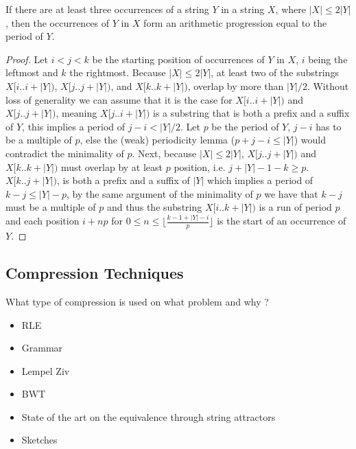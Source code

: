\begin{corollary*}
    If there are at least three occurrences of a string $Y$ in a string $X$, where $|X| \leq 2|Y|$, then the occurrences of $Y$ in $X$ form an arithmetic progression equal to the period of $Y$. 
\end{corollary*}
\begin{proof}
    Let $i<j<k$ be the starting position of occurrences of $Y$ in $X$, $i$ being the leftmost and $k$ the rightmost. Because $|X| \leq 2|Y|$, at least two of the substrings $X[i..i+|Y|)$, $X[j..j+|Y|)$, and $X[k..k+|Y|)$, overlap by more than $|Y|/2$.
    Without loss of generality we can assume that it is the case for $X[i..i+|Y|)$ and $X[j..j+|Y|)$, meaning $X[j..i+|Y|)$ is a substring that is both a prefix and a suffix of $Y$, this implies a period of $j-i < |Y|/2$. 
    Let $p$ be the period of $Y$, $j-i$ has to be a multiple of $p$, else the (weak) periodicity lemma ($p+j-i \leq |Y|$) would contradict the minimality of $p$.
    Next, because $|X| \leq 2|Y|$, $X[j..j+|Y|)$ and $X[k..k+|Y|)$ must overlap by at least $p$ position, i.e. $j+|Y|-1-k \geq p$. 
    $X[k..j+|Y|)$, is both a prefix and a suffix of $|Y|$ which implies a period of $k-j \leq |Y| - p $, by the same argument of the minimality of $p$ we have that $k-j$ must be a multiple of $p$ and thus the substring $X[i..k+|Y|)$ is a run of period $p$ and each position $i+np$ for $0 \leq n \leq \lfloor \frac{k-1+|Y|-i}{p} \rfloor$ is the start of an occurrence of $Y$.
\end{proof}

\subsection{Compression Techniques}\label{sec:prelim:compress}
What type of compression is used on what problem and why ?
\begin{itemize}
\item RLE
\item Grammar
\item Lempel Ziv
\item BWT
\item State of the art on the equivalence through string attractors
\item Sketches
\end{itemize}
